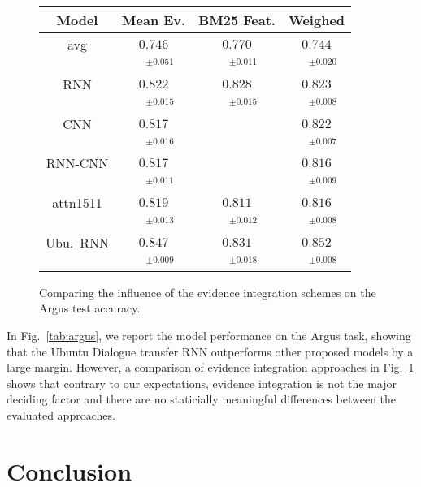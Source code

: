 \documentclass[11pt]{article}
\begin{document}
\begin{figure}[t]
\centering
\setlength{\tabcolsep}{3pt}
\begin{tabular}{|c|c|c|c|}
\hline
Model              & Mean Ev. & BM25 Feat. & Weighed \\
\hline
avg & $0.746$ & $0.770$ & $0.744$\\
 & $\quad^{\pm0.051}$ & $\quad^{\pm0.011}$ & $\quad^{\pm0.020}$\\
\hline
RNN & $0.822$ & $0.828$ & $0.823$\\
 & $\quad^{\pm0.015}$ & $\quad^{\pm0.015}$ & $\quad^{\pm0.008}$\\
CNN & $0.817$ &  & $0.822$\\
 & $\quad^{\pm0.016}$ &  & $\quad^{\pm0.007}$\\
RNN-CNN & $0.817$ &  & $0.816$\\
 & $\quad^{\pm0.011}$ &  & $\quad^{\pm0.009}$\\
attn1511 & $0.819$ & $0.811$ & $0.816$\\
 & $\quad^{\pm0.013}$ & $\quad^{\pm0.012}$ & $\quad^{\pm0.008}$\\
Ubu.\ RNN & $0.847$ & $0.831$ & $0.852$\\
 & $\quad^{\pm0.009}$ & $\quad^{\pm0.018}$ & $\quad^{\pm0.008}$\\
\hline
\end{tabular}
\setlength{\tabcolsep}{6pt}
\vspace*{-0.2cm}
\caption{\footnotesize%
	Comparing the influence of the evidence integration schemes on the Argus test accuracy.
}
\label{tab:argusev}
\end{figure}

In Fig.~\ref{tab:argus}, we report the model performance on the Argus task,
showing that the Ubuntu Dialogue transfer RNN outperforms other proposed
models by a large margin.  However, a comparison of evidence integration
approaches in Fig.~\ref{tab:argusev} shows that contrary to our expectations,
evidence integration is not the major deciding factor and there are no
staticially meaningful differences between the evaluated approaches.




\section{Conclusion}
\label{sec:concl}
\end{document}
